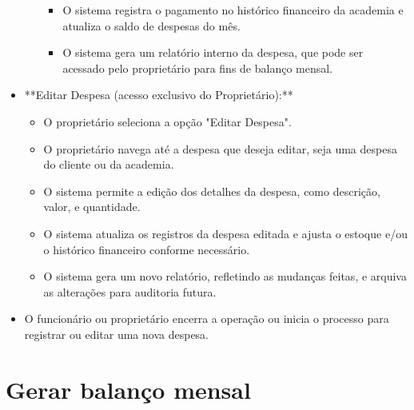 \begin{itemize}
\begin{itemize}
\begin{itemize}
            \item O sistema registra o pagamento no histórico financeiro da academia e atualiza o saldo de despesas do mês.
            \item O sistema gera um relatório interno da despesa, que pode ser acessado pelo proprietário para fins de balanço mensal.
        \end{itemize}
    \end{itemize}
    \item **Editar Despesa (acesso exclusivo do Proprietário):**
    \begin{itemize}
        \item O proprietário seleciona a opção "Editar Despesa".
        \item O proprietário navega até a despesa que deseja editar, seja uma despesa do cliente ou da academia.
        \item O sistema permite a edição dos detalhes da despesa, como descrição, valor, e quantidade.
        \item O sistema atualiza os registros da despesa editada e ajusta o estoque e/ou o histórico financeiro conforme necessário.
        \item O sistema gera um novo relatório, refletindo as mudanças feitas, e arquiva as alterações para auditoria futura.
    \end{itemize}
    \item O funcionário ou proprietário encerra a operação ou inicia o processo para registrar ou editar uma nova despesa.
\end{itemize}

\section*{Gerar balanço mensal}

